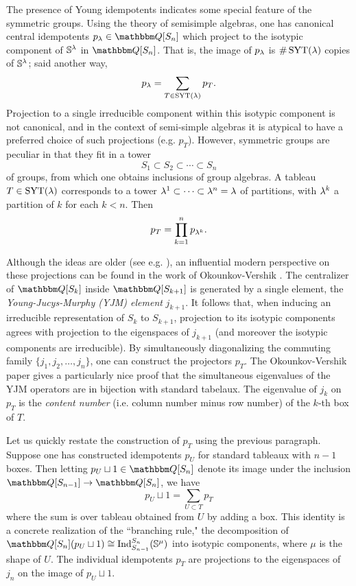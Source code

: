 The presence of Young idempotents indicates some special feature of the symmetric groups. Using the theory of semisimple algebras, one has canonical central idempotents $p_\l \in \Q[S_n]$ which project to the isotypic component of ${\mathbb{S}}^\lambda$ in $\Q[S_n]$.  That is, the image of $p_\lambda$ is $\#\operatorname{SYT}(\lambda)$ copies of ${\mathbb{S}}^\lambda$; said another way,
\begin{equation}
p_\lambda = \sum_{T \in \operatorname{SYT}(\lambda)} p_T.
\end{equation}
Projection to a single irreducible component within this isotypic component is not canonical, and in the context of semi-simple algebras it is atypical to have a preferred choice of such projections (e.g. $p_T$).  However, symmetric groups are peculiar in that they fit in a tower
\begin{equation} S_1 \subset S_2 \subset \cdots \subset S_n \end{equation}
of groups, from which one obtains inclusions of group algebras.  A tableau $T \in \operatorname{SYT}(\lambda)$ corresponds to a tower $\lambda^1 \subset \cdots \subset \lambda^n = \lambda$ of partitions, with $\lambda^k$ a partition of $k$ for each $k < n$. Then
\begin{equation} p_T = \prod_{k=1}^n p_{\lambda^k}. \end{equation}

Although the ideas are older (see e.g. \cite{Jucys, Murphy,DipperJamesIdemp}), an influential modern perspective on these projections can be found in the work of Okounkov-Vershik \cite{OV96}.
The centralizer of $\Q[S_k]$ inside $\Q[S_{k+1}]$ is generated by a single element, the \emph{Young-Jucys-Murphy (YJM) element} $j_{k+1}$. It follows that, when inducing an irreducible
representation of $S_k$ to $S_{k+1}$, projection to its isotypic components agrees with projection to the eigenspaces of $j_{k+1}$ (and moreover the isotypic components are irreducible).
By simultaneously diagonalizing the commuting family $\{j_1, j_2, \ldots, j_n\}$, one can construct the projectors $p_T$. The Okounkov-Vershik paper gives a particularly nice proof that the simultaneous eigenvalues of the YJM operators are in bijection with standard tabelaux. The eigenvalue of $j_k$ on $p_T$ is the \emph{content number} (i.e. column
number minus row number) of the $k$-th box of $T$.

Let us quickly restate the construction of $p_T$ using the previous paragraph. Suppose one has constructed idempotents $p_U$ for standard tableaux with $n-1$ boxes. Then letting $p_U \sqcup 1 \in \Q[S_n]$ denote its image under the inclusion $\Q[S_{n-1}] \to \Q[S_n]$, we have
\begin{equation} p_U \sqcup 1 = \sum_{U \subset T} p_T \end{equation}
where the sum is over tableau obtained from $U$ by adding a box. This identity is a concrete realization of the ``branching rule," the decomposition of $\Q[S_n](p_U \sqcup 1)\cong \Ind_{S_{n-1}}^{S_n}(\SM^{\mu})$ into isotypic components, where $\mu$ is the shape of $U$. The individual idempotents $p_T$ are projections to the eigenspaces of $j_{n}$ on the image of $p_U \sqcup 1$.

